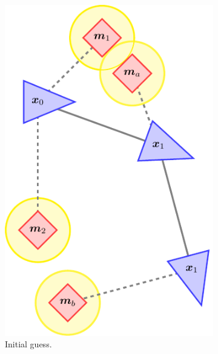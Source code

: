 \begin{figure}[htbp!]
    \centering
    \begin{subfigure}[htbp!]{0.25\textwidth} 
    \centering
    \includegraphics[width=\textwidth]{tikz/incremental1.pdf}
    \caption{Initial guess.}
    \end{subfigure}\hspace{2em}
    \begin{subfigure}[htbp!]{0.25\textwidth} 
        \centering

\end{subfigure}
\end{figure}
